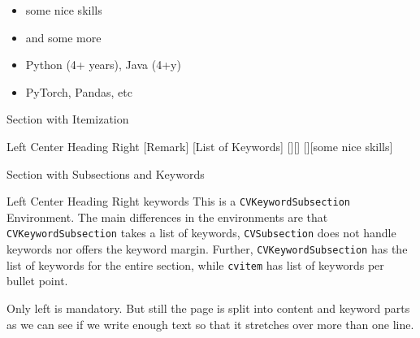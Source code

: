 \documentclass[a4paper]{mcdowellcv}
\begin{document}
	
    \makeheader

    \begin{cvsection}{}
    \begin{multicols}{2}
        \begin{itemize}
            \item some nice skills
            \item and some more 
            \item Python (4+ years), Java (4+y)
            \item PyTorch, Pandas, etc
        \end{itemize}
    \end{multicols}
        
    \end{cvsection}
    
    \begin{cvsection}{Section with Itemization}
        \begin{cvitemize}
            {Left}
            {Center Heading}
            {Right}
                    [Remark]
                    [List of Keywords]
                [][]
                [][some nice skills]
        \end{cvitemize}
    \end{cvsection}

    \begin{cvsection}{Section with Subsections and Keywords}
        \begin{cvkeywordsubsection}
            {Left}
            {Center Heading}
            {Right}
            {keywords}
                 This is a \texttt{CVKeywordSubsection} Environment. 
                 The main differences in the environments are that \texttt{CVKeywordSubsection} takes a list of keywords, \texttt{CVSubsection} does not handle keywords nor offers the keyword margin.
                 Further, \texttt{CVKeywordSubsection} has the list of keywords for the entire section, while \texttt{cvitem} has list of keywords per bullet point.
        \end{cvkeywordsubsection}
        \begin{cvkeywordsubsection}
            {Only left is mandatory.}
            {}
            {}
            {}
            But still the page is split into content and keyword parts as we can see if we write enough text so that it stretches over more than one line. 
        \end{cvkeywordsubsection}
    \end{cvsection}
\end{document}

